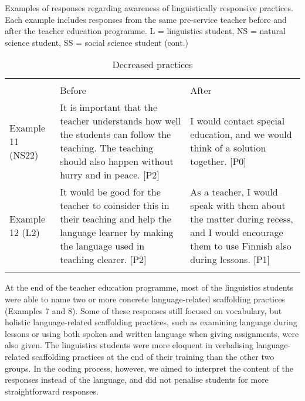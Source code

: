 \documentclass[output=paper]{langscibook}
\begin{document}
\begin{table}
\footnotesize
\ContinuedFloat
\caption{Examples of responses regarding awareness of linguistically responsive practices. Each example includes responses from the same pre-service teacher before and after the teacher education programme. L = linguistics student, NS = natural science student, SS = social science student (cont.)}
\begin{subtable}{\textwidth}
\caption{Decreased practices}
\begin{tabularx}{\textwidth}{p{} QQ}
\lsptoprule
{}\\
 & Before & After\\
\midrule
Example 11 (NS22) & It is important that the teacher understands how well the students can follow the teaching. The teaching should also happen without hurry and in peace. [P2] & I would contact special education, and we would think of a solution together. [P0]\\\addlinespace
Example 12 (L2) & It would be good for the teacher to coinsider this in their teaching and help the language learner by making the language used in teaching clearer. [P2] & As a teacher, I would speak with them about the matter during recess, and I would encourage them to use Finnish also during lessons. [P1]\\
\lspbottomrule
\end{tabularx}
\end{subtable}
\end{table}

At the end of the teacher education programme, most of the linguistics students were able to name two or more concrete language-related scaffolding practices (Examples 7 and 8). Some of these responses still focused on vocabulary, but holistic language-related scaffolding practices, such as examining language during lessons or using both spoken and written language when giving assignments, were also given. The linguistics students were more eloquent in verbalising language-related scaffolding practices at the end of their training than the other two groups. In the coding process, however, we aimed to interpret the content of the responses instead of the language, and did not penalise students for more straightforward responses.  
\end{document}

